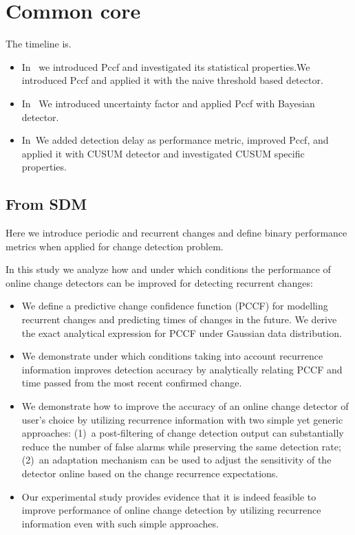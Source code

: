 \chapter{Common core}
    
The timeline is.

\begin{itemize}
  \item In~\cite{MaslovSDM2016} we introduced Pccf and investigated its statistical properties.We introduced Pccf and applied it with the naive threshold based detector.
  \item In~\cite{MaslovIJCNN2017} We introduced uncertainty factor and applied Pccf with Bayesian detector.
  \item In~\cite{Maslov2021}We added detection delay as performance metric, improved Pccf, and applied it with CUSUM detector and investigated CUSUM specific properties.
\end{itemize}

\section{From SDM}

Here we introduce periodic and recurrent changes and define binary performance metrics when applied for change detection problem.

In this study we analyze how and under which conditions the performance of online change detectors can be improved for detecting recurrent changes:
\begin{itemize}	\setlength\itemsep{0pt}
    \item We define a predictive change confidence function (PCCF) for modelling recurrent changes and predicting times of changes in the future. We derive the exact analytical expression for PCCF under Gaussian data distribution.
    \item We demonstrate under which conditions taking into account recurrence information improves detection accuracy by analytically relating PCCF and time passed from the most recent confirmed change.

    \item We demonstrate how to improve the accuracy of an online change detector of user's choice by utilizing recurrence information with two simple yet generic approaches: (1)~a post-filtering of change detection output can substantially reduce the number of false alarms while preserving the same detection rate; (2)~an adaptation mechanism can be used to adjust the sensitivity of the detector online based on the change recurrence expectations.

    \item Our experimental study provides evidence that it is indeed feasible to improve performance of online change detection by utilizing recurrence information even with such simple approaches.
\end{itemize}

